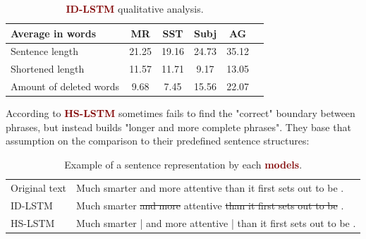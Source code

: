 \documentclass{article}
\begin{document}
\begin{table}[h]
    \centering
    \begin{tabular}{l|ccccc}

        
            \hline
         Average in words & MR & SST & Subj & AG\\
         \hline
        Sentence length     & 21.25 & 19.16 & 24.73 & 35.12\\
         Shortened length   & 11.57 & 11.71 & 9.17 & 13.05\\
        Amount of deleted words & 9.68 & 7.45 & 15.56 & 22.07\\
        
        \hline

    \end{tabular}
    \caption{\textcolor{Maroon}{\textbf{ID-LSTM}} qualitative analysis. }
    \label{tab:id-lstm}
\end{table}

According to \cite{zhang2018} \textcolor{Maroon}{\textbf{HS-LSTM}} sometimes fails to find the "correct" boundary between phrases, but instead builds "longer and more complete phrases". They base that assumption on the comparison to their predefined sentence structures:

\begin{table}[h]
    \centering
    \begin{tabular}{l|l}

    
         \hline
        Original text & Much smarter and more attentive than it first sets out to be .\\
        ID-LSTM & Much smarter \st{and more} attentive \st{than it first sets out to be} .\\
        HS-LSTM & Much smarter | and more attentive | than it first sets out to be .\\
        \hline

    \end{tabular}
    \caption{Example of a sentence representation by each \textcolor{Maroon}{\textbf{models}}.}
    \label{tab:id-lstm}
\end{table}
\end{document}
